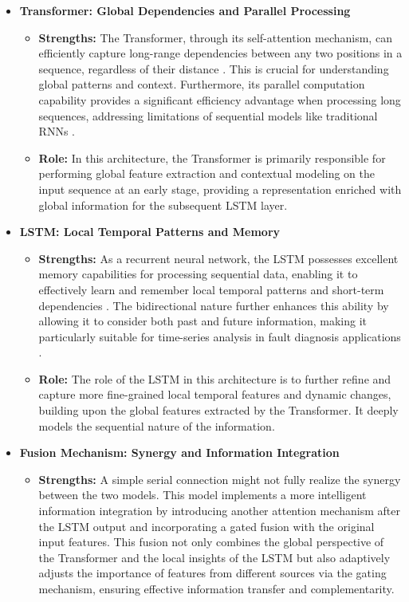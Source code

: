 \begin{itemize}
    \item \textbf{Transformer: Global Dependencies and Parallel Processing}
    \begin{itemize}
        \item \textbf{Strengths:} The Transformer, through its self-attention mechanism, can efficiently capture long-range dependencies between any two positions in a sequence, regardless of their distance \citep{vaswani2017attention, shaw2018self}. This is crucial for understanding global patterns and context. Furthermore, its parallel computation capability provides a significant efficiency advantage when processing long sequences, addressing limitations of sequential models like traditional RNNs \citep{pascanu2013difficulty}.
        \item \textbf{Role:} In this architecture, the Transformer is primarily responsible for performing global feature extraction and contextual modeling on the input sequence at an early stage, providing a representation enriched with global information for the subsequent LSTM layer.
    \end{itemize}
    \item \textbf{LSTM: Local Temporal Patterns and Memory}
    \begin{itemize}
        \item \textbf{Strengths:} As a recurrent neural network, the LSTM possesses excellent memory capabilities for processing sequential data, enabling it to effectively learn and remember local temporal patterns and short-term dependencies \citep{hochreiter1997long}. The bidirectional nature further enhances this ability by allowing it to consider both past and future information, making it particularly suitable for time-series analysis in fault diagnosis applications \citep{filonov2016multivariateindustrialtimeseries, zhao2019deep}.
        \item \textbf{Role:} The role of the LSTM in this architecture is to further refine and capture more fine-grained local temporal features and dynamic changes, building upon the global features extracted by the Transformer. It deeply models the sequential nature of the information.
    \end{itemize}
    \item \textbf{Fusion Mechanism: Synergy and Information Integration}
    \begin{itemize}
        \item \textbf{Strengths:} A simple serial connection might not fully realize the synergy between the two models. This model implements a more intelligent information integration by introducing another attention mechanism after the LSTM output and incorporating a gated fusion with the original input features. This fusion not only combines the global perspective of the Transformer and the local insights of the LSTM but also adaptively adjusts the importance of features from different sources via the gating mechanism, ensuring effective information transfer and complementarity.

\end{itemize}
\end{itemize}
